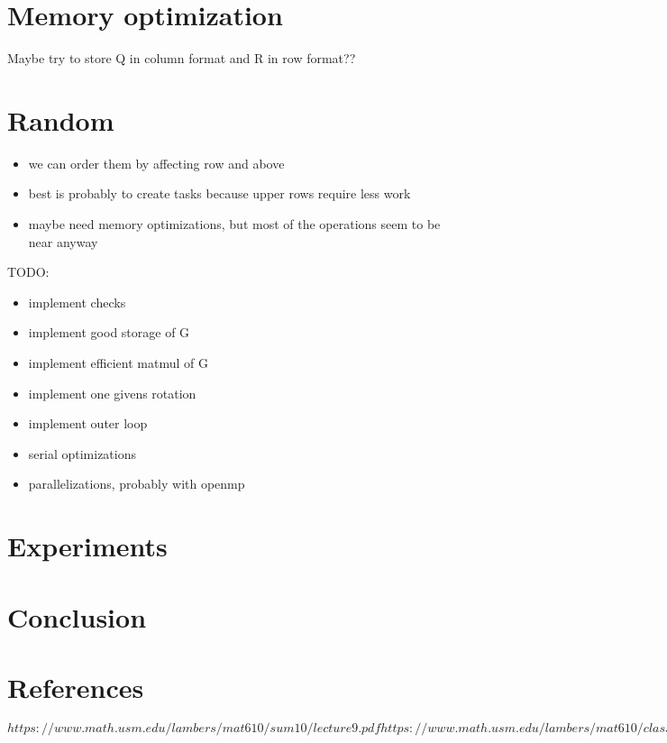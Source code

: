 \documentclass[a4paper]{scrartcl}
\begin{document}
            


            


\section{Memory optimization}
    Maybe try to store Q in column format and R in row format??



\section{Random} 
    \begin{itemize}
        \item we can order them by affecting row and above
        \item best is probably to create tasks because upper rows require less work
        \item maybe need memory optimizations, but most of the operations seem to be near anyway
    \end{itemize}

    TODO:
    \begin{itemize}
        \item implement checks
        \item implement good storage of G
        \item implement efficient matmul of G
        \item implement one givens rotation
        \item implement outer loop
        \item serial optimizations
        \item parallelizations, probably with openmp
    \end{itemize}





\section{Experiments}
\section{Conclusion}
\section{References}
$https://www.math.usm.edu/lambers/mat610/sum10/lecture9.pdf
https://www.math.usm.edu/lambers/mat610/class0208.pdf
https://en.wikipedia.org/wiki/Givens_rotation$
\end{document}
